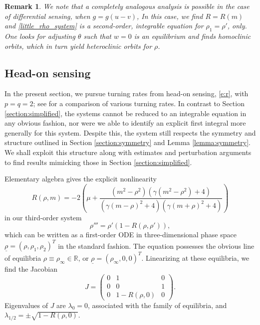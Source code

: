 \documentclass[10pt]{article}
\newtheorem{Remark}[Lemma]{Remark}
\newcommand{\R}{\mathbb{R}}
\begin{document}
\begin{Remark}\label{r:-}
 We note that a completely analogous analysis is possible in the case of \emph{differential sensing}, when $g=g(u-v)$, In this case, we find $R=R(m)$ and \eqref{little_rho_system} is a second-order, integrable equation for $\rho_1=\rho'$, only. One looks for adjusting $\theta$ such that $w=0$ is an equilibrium and finds homoclinic orbits, which in turn yield heteroclinic orbits for $\rho$. 
\end{Remark}


\subsection{Head-on sensing}\label{section:asymmetric}

In the present section, we pursue turning rates from head-on sensing, \eqref{e:r}, with $p=q=2$; see \cite[Fig. 13]{scheel2016wavenumber} for a comparison of various turning rates. In contrast to  Section \ref{section:simplified}, the systems cannot be reduced to an integrable equation in any obvious fashion, nor were we able to identify an explicit first integral more generally for this system.  Despite this, the system still respects the symmetry and structure  outlined in Section \ref{section:symmetry} and Lemma \ref{lemma:symmetry}.  We shall exploit this structure along with estimates and perturbation arguments to find results mimicking those in Section \ref{section:simplified}.

Elementary algebra gives the explicit nonlinearity 
\begin{equation}
R(\rho,m) = -2 \left(\mu+\frac{(m^2-\rho^2 ) \left(\gamma \left(m^2-\rho
   ^2\right)+4\right)}{\left(\gamma (m-\rho )^2+4\right) \left(\gamma
   (m+\rho )^2+4\right)} \right)
\label{bigR}
\end{equation}
in our third-order system
\begin{equation}
\rho''' = \rho'(1-R(\rho,\rho')),
\label{little_rho_system2}
\end{equation}
which can be written as a first-order ODE in three-dimensional phase space $\underline{\rho}=(\rho,\rho_1,\rho_2)^T$ in the standard fashion. The equation possesses the obvious line of equilibria $\rho\equiv \rho_\infty\in\R$, or $\underline{\rho}=(\rho_\infty,0,0)^T$. Linearizing at these equilibria,  we find the Jacobian
\begin{equation}
J = \begin{pmatrix} 0 & 1 & 0\\ 0 & 0 & 1 \\ 0 & 1-R(\rho,0) & 0 \end{pmatrix}.
\label{jacobian}
\end{equation}
Eigenvalues of $J$ are $\lambda_0=0$, associated with the family of equilibria, and $\lambda_{1/2}=\pm\sqrt{1-R(\rho,0)}$.
\end{document}

